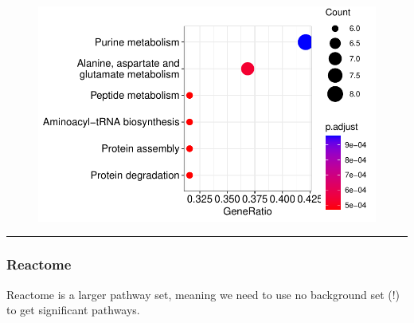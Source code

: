 \documentclass[
  24px,
  letterpaper,
  DIV=11,
  numbers=noendperiod]{scrartcl}
\newenvironment{Shaded}{\begin{snugshade}}{\end{snugshade}}
\newcommand{\AttributeTok}[1]{\textcolor[rgb]{0.40,0.45,0.13}{#1}}
\newcommand{\FunctionTok}[1]{\textcolor[rgb]{0.28,0.35,0.67}{#1}}
\newcommand{\NormalTok}[1]{\textcolor[rgb]{0.00,0.23,0.31}{#1}}
\newcommand{\OtherTok}[1]{\textcolor[rgb]{0.00,0.23,0.31}{#1}}
\newcommand{\SpecialCharTok}[1]{\textcolor[rgb]{0.37,0.37,0.37}{#1}}
\begin{document}
\begin{figure}[H]

{\centering \includegraphics{index_files/figure-pdf/unnamed-chunk-19-1.pdf}

}

\end{figure}

\begin{center}\rule{0.5\linewidth}{0.5pt}\end{center}

\hypertarget{reactome-1}{%
\subsubsection{Reactome}\label{reactome-1}}

Reactome is a larger pathway set, meaning we need to use no background
set (!) to get significant pathways.

\begin{Shaded}
\end{Shaded}
\end{document}
